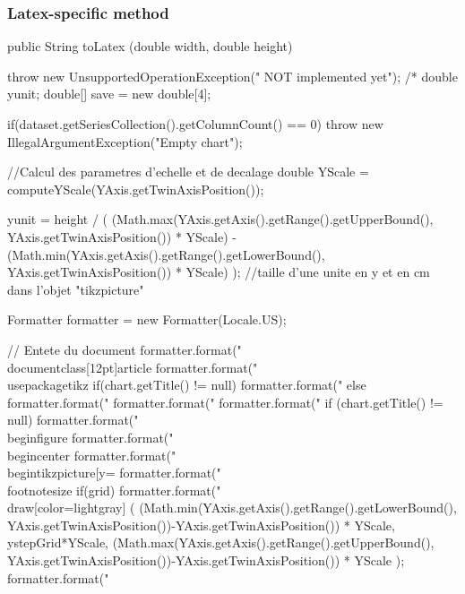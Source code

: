 \subsubsection*{Latex-specific method}

\begin{code}

  public String toLatex (double width, double height) \begin{hide} {
  throw new UnsupportedOperationException(" NOT implemented yet");
/*
      double yunit;
      double[] save = new double[4];

      if(dataset.getSeriesCollection().getColumnCount() == 0)
         throw new IllegalArgumentException("Empty chart");

      //Calcul des parametres d'echelle et de decalage
      double YScale = computeYScale(YAxis.getTwinAxisPosition());


      yunit = height / ( (Math.max(YAxis.getAxis().getRange().getUpperBound(), YAxis.getTwinAxisPosition()) * YScale) - (Math.min(YAxis.getAxis().getRange().getLowerBound(), YAxis.getTwinAxisPosition()) * YScale) );
      //taille d'une unite en y et en cm dans l'objet "tikzpicture"

      Formatter formatter = new Formatter(Locale.US);

      // Entete du document
      formatter.format("\\documentclass[12pt]{article}%
      formatter.format("\\usepackage{tikz}%
      if(chart.getTitle() != null)
         formatter.format("%
      else
         formatter.format("%
      formatter.format("%
      formatter.format("%
      if (chart.getTitle() != null)
         formatter.format("\\begin{figure}%
      formatter.format("\\begin{center}%
      formatter.format("\\begin{tikzpicture}[y=%
      formatter.format("\\footnotesize%
      if(grid)
         formatter.format("\\draw[color=lightgray] (%
            (Math.min(YAxis.getAxis().getRange().getLowerBound(), YAxis.getTwinAxisPosition())-YAxis.getTwinAxisPosition()) * YScale,
            ystepGrid*YScale,
            (Math.max(YAxis.getAxis().getRange().getUpperBound(), YAxis.getTwinAxisPosition())-YAxis.getTwinAxisPosition()) * YScale );
      formatter.format("%

}
\end{hide}
\end{code}
